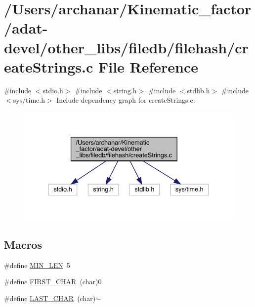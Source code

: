 \hypertarget{adat-devel_2other__libs_2filedb_2filehash_2createStrings_8c}{}\section{/\+Users/archanar/\+Kinematic\+\_\+factor/adat-\/devel/other\+\_\+libs/filedb/filehash/create\+Strings.c File Reference}
\label{adat-devel_2other__libs_2filedb_2filehash_2createStrings_8c}
{\ttfamily \#include $<$stdio.\+h$>$}\newline
{\ttfamily \#include $<$string.\+h$>$}\newline
{\ttfamily \#include $<$stdlib.\+h$>$}\newline
{\ttfamily \#include $<$sys/time.\+h$>$}\newline
Include dependency graph for create\+Strings.\+c\+:
\nopagebreak
\begin{figure}[H]
\begin{center}
\leavevmode
\includegraphics[width=336pt]{d5/dd6/adat-devel_2other__libs_2filedb_2filehash_2createStrings_8c__incl}
\end{center}
\end{figure}
\subsection*{Macros}
\begin{DoxyCompactItemize}
\item 
\#define \mbox{\hyperlink{adat-devel_2other__libs_2filedb_2filehash_2createStrings_8c_aa69f8dba9add1a52ce3cf7bcfafcfda0}{M\+I\+N\+\_\+\+L\+EN}}~5
\item 
\#define \mbox{\hyperlink{adat-devel_2other__libs_2filedb_2filehash_2createStrings_8c_af1c5fd90d1b8a22169133f549223f2e1}{F\+I\+R\+S\+T\+\_\+\+C\+H\+AR}}~(char)\textquotesingle{}0\textquotesingle{}
\item 
\#define \mbox{\hyperlink{adat-devel_2other__libs_2filedb_2filehash_2createStrings_8c_a31911f021a0d09eed9a5269d0648dfde}{L\+A\+S\+T\+\_\+\+C\+H\+AR}}~(char)\textquotesingle{}$\sim$\textquotesingle{}
\end{DoxyCompactItemize}
